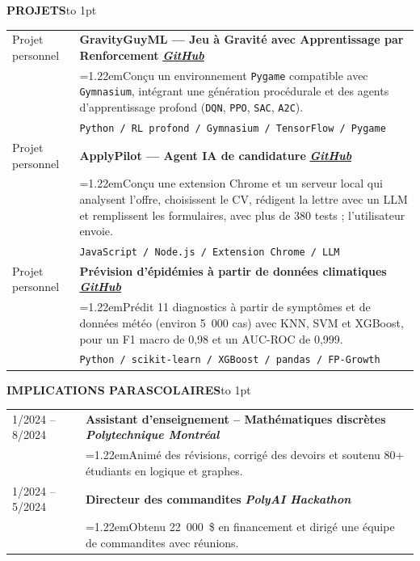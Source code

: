 \documentclass[a4paper,10pt]{article}
\newcommand{\sechead}[1]{\vspace{0.5em}\noindent\textbf{\large #1}\hspace{0.8em}\leaders\hbox to 1pt{\hss\raisebox{0.3em}{\rule{1pt}{0.4pt}}\hss}\hfill\null\par\vspace{0.45em}}
\newcommand{\bul}{\hangindent=1.22em\hangafter=1\hspace{0.5em}\textbullet\hspace{0.4em}}
\begin{document}
    \vspace{0.2em}
    \sechead{PROJETS}
    
    \begin{tabularx}{\textwidth}{@{}p{3cm} X@{}}
        Projet personnel & \textbf{GravityGuyML — Jeu à Gravité avec Apprentissage par Renforcement} \hfill \textbf{\textit{\href{https://github.com/Mbaka11/Gravity-Guy-ML}{GitHub}}} \\
        & \bul Conçu un environnement \texttt{Pygame} compatible avec \texttt{Gymnasium}, intégrant une génération procédurale et des agents d’apprentissage profond (\texttt{DQN}, \texttt{PPO}, \texttt{SAC}, \texttt{A2C}). \\
        & \texttt{Python / RL profond / Gymnasium / TensorFlow / Pygame} \\[0.2em]
        
        Projet personnel & \textbf{ApplyPilot — Agent IA de candidature} \hfill \textbf{\textit{\href{https://github.com/Mbaka11/ApplyPilot}{GitHub}}} \\
        & \bul Conçu une extension Chrome et un serveur local qui analysent l’offre, choisissent le CV, rédigent la lettre avec un LLM et remplissent les formulaires, avec plus de 380 tests ; l’utilisateur envoie. \\
        & \texttt{JavaScript / Node.js / Extension Chrome / LLM} \\[0.2em]

        Projet personnel & 
        \textbf{Prévision d’épidémies à partir de données climatiques} \hfill \textbf{\textit{\href{https://github.com/Mbaka11/20251R0136COSE47101}{GitHub}}}\\[0.2em]
        & \bul Prédit 11 diagnostics à partir de symptômes et de données météo (environ 5~000 cas) avec KNN, SVM et XGBoost, pour un F1 macro de 0,98 et un AUC-ROC de 0,999. \\
        & \texttt{Python / scikit-learn / XGBoost / pandas / FP-Growth} \\
    \end{tabularx}

    \vspace{0.2em}
    \sechead{IMPLICATIONS PARASCOLAIRES}
    
    \begin{tabularx}{\textwidth}{@{}p{3cm} X@{}}
        1/2024 -- 8/2024 & 
        \textbf{Assistant d’enseignement – Mathématiques discrètes} \hfill \textbf{\textit{Polytechnique Montréal}} \\
        & \bul Animé des révisions, corrigé des devoirs et soutenu 80+ étudiants en logique et graphes.\\[0.2em]
        
        1/2024 -- 5/2024 & 
        \textbf{Directeur des commandites} \hfill \textbf{\textit{PolyAI Hackathon}} \\
        & \bul Obtenu 22~000~\$ en financement et dirigé une équipe de commandites avec réunions. 
    \end{tabularx}

\vspace{0.5cm}
\end{document}
